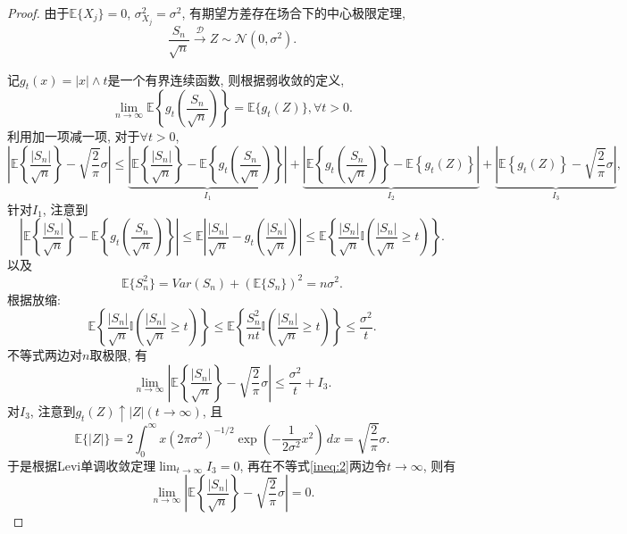 \documentclass[UTF8, a4paper]{article}
\begin{document}
\begin{proof}



由于\(\mathbb{E}\{X_j\} = 0\), \(\sigma_{X_j}^2 = \sigma^2\), 有期望方差存在场合下的中心极限定理, 
$$
\frac{S_n}{ \sqrt{n}} \xrightarrow{\mathcal{D}} Z \sim \mathcal{N}(0, \sigma^2).
$$

记\(g_t(x) = |x|\land t\)是一个有界连续函数, 则根据弱收敛的定义, 
$$
\lim_{n\to\infty} \mathbb{E}\left\{g_t\left(\frac{S_n}{ \sqrt{n}}\right)\right\} = \mathbb{E}\{g_t(Z)\}, \forall t > 0.
$$
利用加一项减一项, 对于\(\forall t > 0\),
$$
\left|\mathbb{E}\left\{\frac{|S_n|}{ \sqrt{n}}\right\} - \sqrt{\frac{2}{\pi}} \sigma\right| \leq \underset{ I_1}{\underbrace{\left|\mathbb{E}\left\{\frac{|S_n|}{ \sqrt{n}}\right\} - \mathbb{E}\left\{g_t\left(\frac{S_n}{ \sqrt{n}}\right)\right\}\right|}} + \underset{I_2}{\underbrace{\left|\mathbb{E}\left\{g_t\left(\frac{S_n}{ \sqrt{n}}\right)\right\} - \mathbb{E}\left\{g_t\left(Z\right)\right\}\right|}} + \underset{I_3}{\underbrace{\left|\mathbb{E}\left\{g_t\left(Z\right)\right\} - \sqrt{\frac{2}{\pi}} \sigma\right|}},
$$
针对\(I_1\), 
注意到
$$
\left|\mathbb{E}\left\{\frac{|S_n|}{ \sqrt{n}}\right\} - \mathbb{E}\left\{g_t\left(\frac{S_n}{ \sqrt{n}}\right)\right\}\right| \leq \mathbb{E}\left|\frac{|S_n|}{\sqrt{n}} - g_t\left(\frac{|S_n|}{\sqrt{n}}\right)\right| \leq \mathbb{E}\left\{\frac{|S_n|}{\sqrt{n}} \mathbb{I}\left(\frac{|S_n|}{\sqrt{n}} \geq t\right)\right\}.
$$
以及 
$$
\mathbb{E}\{S_n^2\} = Var(S_n) + (\mathbb{E}\{S_n\})^2 = n\sigma^2.
$$
根据{\color{red}放缩}:
$$
\mathbb{E}\left\{\frac{|S_n|}{\sqrt{n}} \mathbb{I}\left(\frac{|S_n|}{\sqrt{n}} \geq t\right)\right\} \leq \mathbb{E}\left\{\frac{S_n^2}{nt} \mathbb{I}\left(\frac{|S_n|}{\sqrt{n}} \geq t\right)\right\} \leq \frac{\sigma^2}{t}.
$$
不等式两边对\(n\)取极限, 有 
\begin{equation}
    \lim_{n\to\infty}\left|\mathbb{E}\left\{\frac{|S_n|}{ \sqrt{n}}\right\} - \sqrt{\frac{2}{\pi}} \sigma\right|  \leq  \frac{\sigma^2}{t} + I_3. \label{ineq:2}
\end{equation}
对\(I_3\), 注意到\(g_t(Z) \uparrow |Z|(t\to \infty)\), 且 
$$
\mathbb{E}\{|Z|\} = 2 \int_{0}^{\infty} x (2\pi\sigma^2)^{-1/2} \exp\left(-\frac{1}{2\sigma^2} x^2\right)\, dx = \sqrt{\frac{2}{\pi}}\sigma.
$$
于是根据Levi单调收敛定理\(\lim_{t\to\infty} I_3 = 0\), 再在不等式\eqref{ineq:2}两边令\(t \to \infty\), 则有 
$$
\lim_{n\to\infty}\left|\mathbb{E}\left\{\frac{|S_n|}{ \sqrt{n}}\right\} - \sqrt{\frac{2}{\pi}} \sigma\right| = 0.
$$

\end{proof}
\end{document}
